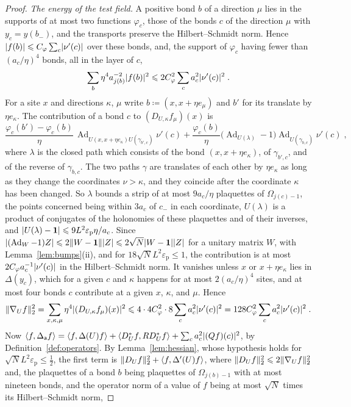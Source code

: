 \documentclass[11pt]{preprint}
\newcommand{\id}{\mathbf 1}
\newcommand{\Ad}{\operatorname{Ad}}
\DeclarePairedDelimiter{\abs}{\lvert}{\rvert}
\DeclarePairedDelimiter{\norm}{\lVert}{\rVert}
\numberwithin{equation}{section}
\begin{document}
\begin{proof}
\emph{The energy of the test field.} A positive bond $b$ of a direction $\mu$ lies in the supports of at most two functions $\varphi_c$, those of the bonds $c$ of the direction $\mu$ with $y_c = y(b_-)$, and the transports preserve the Hilbert--Schmidt norm. Hence $\abs{f(b)} \leqslant C_\varphi\sum_c\abs{\nu'(c)}$ over these bonds, and, the support of $\varphi_c$ having fewer than $(a_c/\eta)^4$ bonds, all in the layer of $c$,
\[
    \sum_b\eta^4a_{j(b)}^{-2}\abs{f(b)}^2 \leqslant 2C_\varphi^2\sum_ca_c^2\abs{\nu'(c)}^2\;.
\]
For a site $x$ and directions $\kappa$, $\mu$ write $b \coloneqq (x, x + \eta e_\mu)$ and $b'$ for its translate by $\eta e_\kappa$. The contribution of a bond $c$ to $(D_{U,\kappa}f_\mu)(x)$ is
\[
    \frac{\varphi_c(b') - \varphi_c(b)}{\eta}\,\Ad_{U(x, x + \eta e_\kappa)U(\gamma_{b',c})}\nu'(c) + \frac{\varphi_c(b)}{\eta}\bigl(\Ad_{U(\lambda)} - 1\bigr)\Ad_{U(\gamma_{b,c})}\nu'(c)\;,
\]
where $\lambda$ is the closed path which consists of the bond $(x, x + \eta e_\kappa)$, of $\gamma_{b',c}$, and of the reverse of $\gamma_{b,c}$. The two paths $\gamma$ are translates of each other by $\eta e_\kappa$ as long as they change the coordinates $\nu > \kappa$, and they coincide after the coordinate $\kappa$ has been changed. So $\lambda$ bounds a strip of at most $9a_c/\eta$ plaquettes of $\Omega_{j(c)-1}$, the points concerned being within $3a_c$ of $c_-$ in each coordinate, $U(\lambda)$ is a product of conjugates of the holonomies of these plaquettes and of their inverses, and $\abs{U(\lambda) - \id} \leqslant 9L^2\varepsilon_{\mathrm p}\eta/a_c$. Since $\abs{(\Ad_W - 1)Z} \leqslant 2\norm{W - \id}\abs Z \leqslant 2\sqrt N\abs{W - \id}\abs Z$ for a unitary matrix $W$, with Lemma~\ref{lem:bumps}(ii), and for $18\sqrt NL^2\varepsilon_{\mathrm p} \leqslant 1$, the contribution is at most $2C_\varphi a_c^{-1}\abs{\nu'(c)}$ in the Hilbert--Schmidt norm. It vanishes unless $x$ or $x + \eta e_\kappa$ lies in $\Delta(y_c)$, which for a given $c$ and $\kappa$ happens for at most $2(a_c/\eta)^4$ sites, and at most four bonds $c$ contribute at a given $x$, $\kappa$, and $\mu$. Hence
\[
    \norm{\nabla_Uf}_2^2 = \sum_{x,\kappa,\mu}\eta^4\abs{(D_{U,\kappa}f_\mu)(x)}^2 \leqslant 4 \cdot 4C_\varphi^2 \cdot 8\sum_ca_c^2\abs{\nu'(c)}^2 = 128C_\varphi^2\sum_ca_c^2\abs{\nu'(c)}^2\;.
\]
Now $\langle f, \Delta_{\mathsf a}f\rangle = \langle f, \Delta(U)f\rangle + \langle D^*_Uf, RD^*_Uf\rangle + \sum_ca_c^2\abs{(Qf)(c)}^2$, by Definition~\ref{def:operators}. By Lemma~\ref{lem:hessian}, whose hypothesis holds for $\sqrt NL^2\varepsilon_{\mathrm p} \leqslant \frac{1}{2}$, the first term is $\norm{D_Uf}_2^2 + \langle f, \Delta'(U)f\rangle$, where $\norm{D_Uf}_2^2 \leqslant 2\norm{\nabla_Uf}_2^2$ and, the plaquettes of a bond $b$ being plaquettes of $\Omega_{j(b)-1}$ with at most nineteen bonds, and the operator norm of a value of $f$ being at most $\sqrt N$ times its Hilbert--Schmidt norm,

\end{proof}
\end{document}
